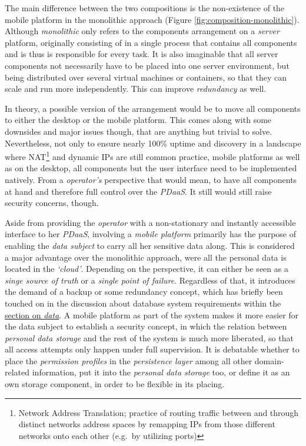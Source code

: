 \documentclass[12pt,english,a4paper,titlepage,cleardoublepage=empty,dottedtoc]{report}
\begin{document}
The main difference between the two compositions is the non-existence of
the mobile platform in the monolithic approach (Figure
\ref{fig:composition-monolithic}). Although \emph{monolithic} only
refers to the components arrangement on a \emph{server} platform,
originally consisting of in a single process that contains all
components and is thus is responsible for every task. It is also
imaginable that all server components not necessarily have to be placed
into one server environment, but being distributed over several virtual
machines or containers, so that they can scale and run more
independently. This can improve \emph{redundancy} as well.

In theory, a possible version of the arrangement would be to move all
components to either the desktop or the mobile platform. This comes
along with some downsides and major issues though, that are anything but
trivial to solve. Nevertheless, not only to ensure nearly 100\% uptime
and discovery in a landscape where NAT\footnote{Network Address
  Translation; practice of routing traffic between and through distinct
  networks address spaces by remapping IPs from those different networks
  onto each other (e.g.~by utilizing ports)} and dynamic IPs are still
common practice, mobile platforms as well as on the desktop, all
components but the user interface need to be implemented natively. From
a \emph{operator's} perspective that would mean, to have all components
at hand and therefore full control over the \emph{PDaaS}. It still would
still raise security concerns, though.

Aside from providing the \emph{operator} with a non-stationary and
instantly accessible interface to her \emph{PDaaS}, involving a
\emph{mobile platform} primarily has the purpose of enabling the
\emph{data subject} to carry all her sensitive data along. This is
considered a major advantage over the monolithic approach, were all the
personal data is located in the \emph{`cloud'}. Depending on the
perspective, it can either be seen as a \emph{singe source of truth} or
a \emph{single point of failure}. Regardless of that, it introduces the
demand of a backup or some redundancy concept, which has briefly been
touched on in the discussion about database system requirements within
the \protect\hyperlink{data}{section on \emph{data}}. A mobile platform
as part of the system makes it more easier for the data subject to
establish a security concept, in which the relation between
\emph{personal data storage} and the rest of the system is much more
liberated, so that all access attempts only happen under full
supervision. It is debatable whether to place the \emph{permission
profiles} in the \emph{persistence layer} among all other domain-related
information, put it into the \emph{personal data storage} too, or define
it as an own storage component, in order to be flexible in its placing.
\end{document}

